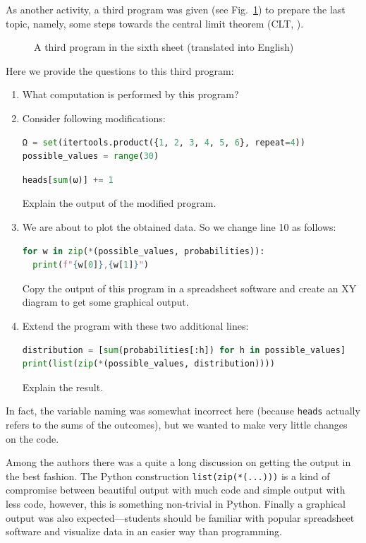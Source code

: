\documentclass[]{interact}
\theoremstyle{plain}%
\theoremstyle{definition}
\theoremstyle{remark}
\begin{document}
As another activity, a third program was given (see Fig.~\ref{6c.py}) to prepare the last
topic, namely, some steps towards the central limit theorem (CLT, \cite{Polya1920}).
\begin{figure}

\caption{A third program in the sixth sheet (translated into English)}
\label{6c.py}
\end{figure}
Here we provide the questions to this third program:
\begin{enumerate}
\item What computation is performed by this program?
\item Consider following modifications:
\begin{lstlisting}[language=Python,firstnumber=2]
Ω = set(itertools.product({1, 2, 3, 4, 5, 6}, repeat=4))
possible_values = range(30)
\end{lstlisting}
\begin{lstlisting}[language=Python,firstnumber=8]
  heads[sum(ω)] += 1
\end{lstlisting}
Explain the output of the modified program.
\item We are about to plot the obtained data. So we change line 10 as follows:
\begin{lstlisting}[language=Python,firstnumber=10]
for w in zip(*(possible_values, probabilities)):
  print(f"{w[0]},{w[1]}")
\end{lstlisting}
Copy the output of this program in a spreadsheet software and create an XY diagram
to get some graphical output.
\item Extend the program with these two additional lines:
\begin{lstlisting}[language=Python,firstnumber=12]
distribution = [sum(probabilities[:h]) for h in possible_values]
print(list(zip(*(possible_values, distribution))))
\end{lstlisting}
Explain the result.
\end{enumerate}
In fact, the variable naming was somewhat incorrect here (because \texttt{heads} 
actually refers to the sums of the outcomes), but we wanted to make very little
changes on the code.

Among the authors there was a quite a long discussion on getting the output in
the best fashion. The Python construction \texttt{list(zip(*(...)))} is a kind
of compromise between beautiful output with much code and simple output with less code,
however, this is something non-trivial in Python.
Finally a graphical output was also expected---students should be familiar with
popular spreadsheet software and visualize data in an easier way than programming.
\end{document}
